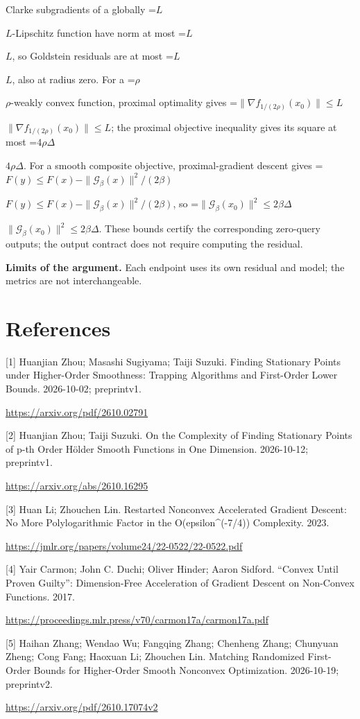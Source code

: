 \documentclass[10pt,a4paper]{article}
\newcommand{\AtlasMath}[1]{\par\begingroup\centering\setbox0=\hbox{$\displaystyle #1$}\ifdim\wd0>1.4\linewidth\typeout{ATLAS WIDE FORMULA: \the\wd0}\fi\ifdim\wd0>\linewidth\resizebox{\linewidth}{!}{\box0}\else\box0\fi\par\endgroup}
\newcommand{\AtlasInlineMath}[1]{\begingroup\setbox0=\hbox{$#1$}\ifdim\wd0>.4\linewidth\endgroup\AtlasMath{#1}\else\endgroup$#1$\fi}
\begin{document}
Clarke subgradients of a globally \AtlasInlineMath{L}-Lipschitz function have norm at most \AtlasInlineMath{L}, so Goldstein residuals are at most \AtlasInlineMath{L}, also at radius zero. For a \AtlasInlineMath{\rho}-weakly convex function, proximal optimality gives
\AtlasInlineMath{\|\nabla f_{1/(2\rho)}(x_0)\|\le L}; the proximal objective inequality gives its square at most \AtlasInlineMath{4\rho\Delta}.
For a smooth composite objective, proximal-gradient descent gives
\AtlasInlineMath{F(y)\le F(x)-\|\mathcal G_\beta(x)\|^2/(2\beta)},
so \AtlasInlineMath{\|\mathcal G_\beta(x_0)\|^2\le2\beta\Delta}.
These bounds certify the corresponding zero-query outputs; the output contract does not require computing the residual.

\textbf{Limits of the argument.} Each endpoint uses its own residual and model; the metrics are not interchangeable.

\section{References}
[1] Huanjian Zhou; Masashi Sugiyama; Taiji Suzuki. Finding Stationary Points under Higher-Order Smoothness: Trapping Algorithms and First-Order Lower Bounds. 2026-10-02; preprintv1.

\url{https://arxiv.org/pdf/2610.02791}

[2] Huanjian Zhou; Taiji Suzuki. On the Complexity of Finding Stationary Points of p-th Order Hölder Smooth Functions in One Dimension. 2026-10-12; preprintv1.

\url{https://arxiv.org/abs/2610.16295}

[3] Huan Li; Zhouchen Lin. Restarted Nonconvex Accelerated Gradient Descent: No More Polylogarithmic Factor in the O(epsilon\textasciicircum{}(-7/4)) Complexity. 2023.

\url{https://jmlr.org/papers/volume24/22-0522/22-0522.pdf}

[4] Yair Carmon; John C. Duchi; Oliver Hinder; Aaron Sidford. “Convex Until Proven Guilty”: Dimension-Free Acceleration of Gradient Descent on Non-Convex Functions. 2017.

\url{https://proceedings.mlr.press/v70/carmon17a/carmon17a.pdf}

[5] Haihan Zhang; Wendao Wu; Fangqing Zhang; Chenheng Zhang; Chunyuan Zheng; Cong Fang; Haoxuan Li; Zhouchen Lin. Matching Randomized First-Order Bounds for Higher-Order Smooth Nonconvex Optimization. 2026-10-19; preprintv2.

\url{https://arxiv.org/pdf/2610.17074v2}
\end{document}
